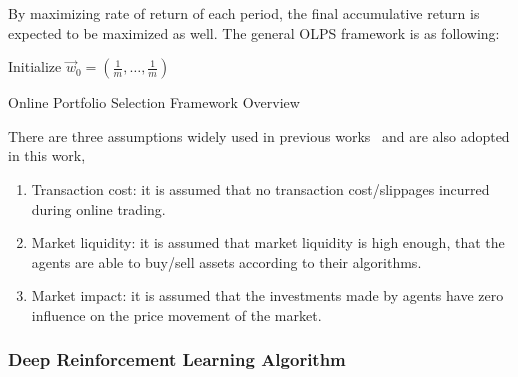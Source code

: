 By maximizing rate of return of each period, the final accumulative return is expected to be maximized as well. The general OLPS framework is as following:

\begin{algorithm}[H]
\SetAlgoLined
{}
{Initialize $\vec{w}_0 = (\frac{1}{m},\ldots,\frac{1}{m})$}

 \caption{Online Portfolio Selection Framework Overview}
\end{algorithm}

There are three assumptions widely used in previous works~\cite{jiang2017deep, li2014online} and are also adopted in this work,
\begin{enumerate}
\label{num:assumptions}
    \item Transaction cost: it is assumed that no transaction cost/slippages incurred during online trading.
    \item Market liquidity: it is assumed that market liquidity is high enough, that the agents are able to buy/sell assets according to their algorithms.
    \item Market impact: it is assumed that the investments made by agents have zero influence on the price movement of the market.
\end{enumerate}

\subsubsection{Deep Reinforcement Learning Algorithm}
\label{subsub: drl}

